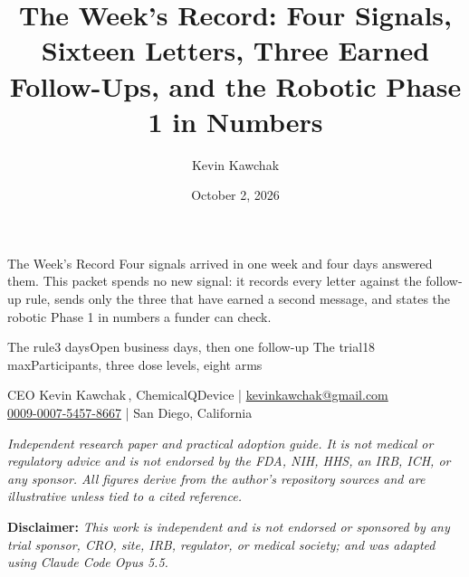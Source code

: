\documentclass[11pt]{article}
\title{The Week's Record: Four Signals, Sixteen Letters, Three Earned Follow-Ups, and the Robotic Phase 1 in Numbers}
\author{Kevin Kawchak}
\date{October 2, 2026}
\begin{document}
\thispagestyle{plain}

%
{The Week's Record}%
{Four signals arrived in one week and four days answered them. This packet spends no new
signal: it records every letter against the follow-up rule, sends only the three that have
earned a second message, and states the robotic Phase 1 in numbers a funder can check.}

\vspace{0.15em}

\begin{center}
 \enspace {} \enspace
{} \enspace {} \enspace
{}
\end{center}

\vspace{-0.15em}

%
{The rule}{3 days}{Open business days, then one follow-up}%
{The trial}{18 max}{Participants, three dose levels, eight arms}

\vspace{-0.1em}
\apprule{0.9pt}

\begin{center}\small
CEO Kevin Kawchak\,, ChemicalQDevice \;|\;
\href{mailto:kevinkawchak@gmail.com}{kevinkawchak@gmail.com}\\
\href{https://orcid.org/0009-0007-5457-8667}{0009-0007-5457-8667} \;|\;
San Diego, California
\end{center}

\vspace{-0.25em}
\apprule{0.5pt}

\noindent\footnotesize\textit{Independent research paper and practical adoption
guide. It is not medical or regulatory advice and is not endorsed by the FDA,
NIH, HHS, an IRB, ICH, or any sponsor. All figures derive from the author's
repository sources and are illustrative unless tied to a cited
reference.}\normalsize\par

\vspace{0.12em}

\noindent\footnotesize\textbf{Disclaimer:} \textit{This work is independent and
is not endorsed or sponsored by any trial sponsor, CRO, site, IRB, regulator, or
medical society; and was adapted using Claude Code Opus 5.5.}\normalsize\par
\end{document}
